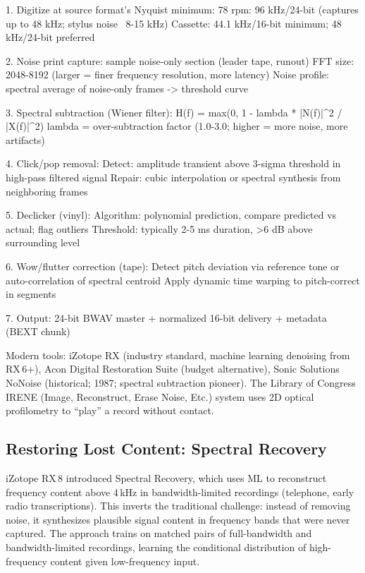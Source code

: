 \documentclass[11pt,letterpaper]{article}
\newenvironment{asciibox}{%
  \begin{tcolorbox}[colback=MidGray!8,colframe=MidGray!40,arc=2pt,left=6pt,right=6pt,top=4pt,bottom=4pt,breakable]
  \ttfamily\small
}{%
  \end{tcolorbox}
}
\begin{document}
\begin{asciibox}
1. Digitize at source format's Nyquist minimum:
   78 rpm: 96 kHz/24-bit (captures up to 48 kHz; stylus noise ~8-15 kHz)
   Cassette: 44.1 kHz/16-bit minimum; 48 kHz/24-bit preferred

2. Noise print capture: sample noise-only section (leader tape, runout)
   FFT size: 2048-8192 (larger = finer frequency resolution, more latency)
   Noise profile: spectral average of noise-only frames -> threshold curve

3. Spectral subtraction (Wiener filter):
   H(f) = max(0, 1 - lambda * |N(f)|^2 / |X(f)|^2)
   lambda = over-subtraction factor (1.0-3.0; higher = more noise, more artifacts)

4. Click/pop removal:
   Detect: amplitude transient above 3-sigma threshold in high-pass filtered signal
   Repair: cubic interpolation or spectral synthesis from neighboring frames

5. Declicker (vinyl):
   Algorithm: polynomial prediction, compare predicted vs actual; flag outliers
   Threshold: typically 2-5 ms duration, >6 dB above surrounding level

6. Wow/flutter correction (tape):
   Detect pitch deviation via reference tone or auto-correlation of spectral centroid
   Apply dynamic time warping to pitch-correct in segments

7. Output: 24-bit BWAV master + normalized 16-bit delivery + metadata (BEXT chunk)
\end{asciibox}

Modern tools: iZotope RX (industry standard, machine learning denoising from RX\,6+), Acon Digital Restoration Suite (budget alternative), Sonic Solutions NoNoise (historical; 1987; spectral subtraction pioneer). The Library of Congress IRENE (Image, Reconstruct, Erase Noise, Etc.) system uses 2D optical profilometry to ``play'' a record without contact.

\subsection{Restoring Lost Content: Spectral Recovery}

iZotope RX\,8 introduced Spectral Recovery, which uses ML to reconstruct frequency content above 4\,kHz in bandwidth-limited recordings (telephone, early radio transcriptions). This inverts the traditional challenge: instead of removing noise, it synthesizes plausible signal content in frequency bands that were never captured. The approach trains on matched pairs of full-bandwidth and bandwidth-limited recordings, learning the conditional distribution of high-frequency content given low-frequency input.
\end{document}
